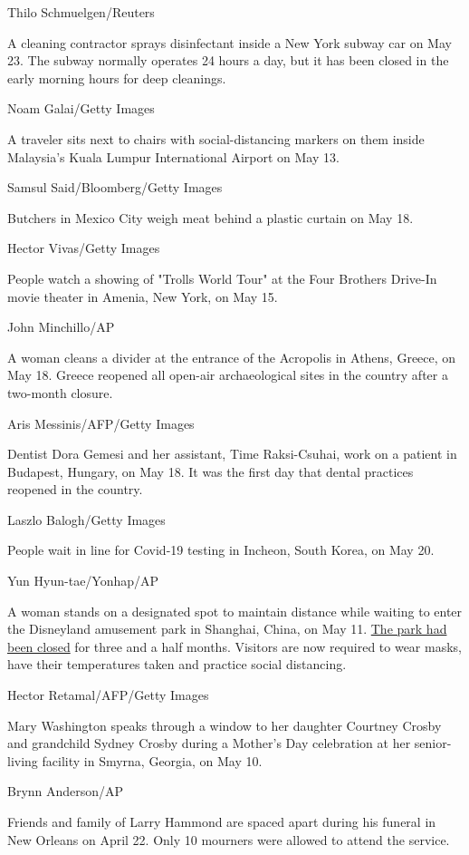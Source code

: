 Thilo Schmuelgen/Reuters

A cleaning contractor sprays disinfectant inside a New York subway car
on May 23. The subway normally operates 24 hours a day, but it has been
closed in the early morning hours for deep cleanings.

Noam Galai/Getty Images

A traveler sits next to chairs with social-distancing markers on them
inside Malaysia's Kuala Lumpur International Airport on May 13.

Samsul Said/Bloomberg/Getty Images

Butchers in Mexico City weigh meat behind a plastic curtain on May 18.

Hector Vivas/Getty Images

People watch a showing of "Trolls World Tour" at the Four Brothers
Drive-In movie theater in Amenia, New York, on May 15.

John Minchillo/AP

A woman cleans a divider at the entrance of the Acropolis in Athens,
Greece, on May 18. Greece reopened all open-air archaeological sites in
the country after a two-month closure.

Aris Messinis/AFP/Getty Images

Dentist Dora Gemesi and her assistant, Time Raksi-Csuhai, work on a
patient in Budapest, Hungary, on May 18. It was the first day that
dental practices reopened in the country.

Laszlo Balogh/Getty Images

People wait in line for Covid-19 testing in Incheon, South Korea, on May
20.

Yun Hyun-tae/Yonhap/AP

A woman stands on a designated spot to maintain distance while waiting
to enter the Disneyland amusement park in Shanghai, China, on May 11.
\href{http://www.cnn.com/travel/article/shanghai-disneyland-reopens-intl-hnk/index.html}{The
park had been closed} for three and a half months. Visitors are now
required to wear masks, have their temperatures taken and practice
social distancing.

Hector Retamal/AFP/Getty Images

Mary Washington speaks through a window to her daughter Courtney Crosby
and grandchild Sydney Crosby during a Mother's Day celebration at her
senior-living facility in Smyrna, Georgia, on May 10.

Brynn Anderson/AP

Friends and family of Larry Hammond are spaced apart during his funeral
in New Orleans on April 22. Only 10 mourners were allowed to attend the
service.


